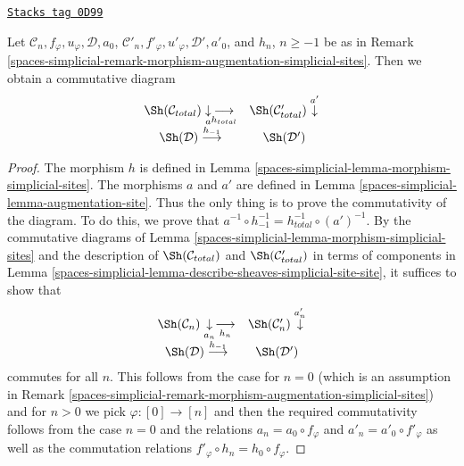 \begin{lemma}
\label{spaces-simplicial-lemma-morphism-augmentation-simplicial-sites}
\href{https://stacks.math.columbia.edu/tag/0D99}{\texttt{Stacks tag 0D99}}

Let $\mathcal{C}_n, f_\varphi, u_\varphi, \mathcal{D}, a_0$,
$\mathcal{C}'_n, f'_\varphi, u'_\varphi, \mathcal{D}', a'_0$, and
$h_n$, $n \geq -1$ be as in
Remark \ref{spaces-simplicial-remark-morphism-augmentation-simplicial-sites}.
Then we obtain a commutative diagram
$$
\begin{array}{cc}\Sh(\mathcal{C}_{total}) \underset{a}{\downarrow}\underset{h_{total}}{\longrightarrow} & \Sh(\mathcal{C}'_{total}) \overset{a'}{\downarrow} \\ \Sh(\mathcal{D}) \overset{h_{-1}}{\longrightarrow} & \Sh(\mathcal{D}')\end{array}
$$
\end{lemma}

\begin{proof}
The morphism $h$ is defined in Lemma \ref{spaces-simplicial-lemma-morphism-simplicial-sites}.
The morphisms $a$ and $a'$ are defined in Lemma \ref{spaces-simplicial-lemma-augmentation-site}.
Thus the only thing is to prove the commutativity of the diagram.
To do this, we prove that
$a^{-1} \circ h_{-1}^{-1} = h_{total}^{-1} \circ (a')^{-1}$.
By the commutative diagrams of
Lemma \ref{spaces-simplicial-lemma-morphism-simplicial-sites}
and the description of $\Sh(\mathcal{C}_{total})$
and $\Sh(\mathcal{C}'_{total})$ in terms of components
in Lemma \ref{spaces-simplicial-lemma-describe-sheaves-simplicial-site-site},
it suffices to show that
$$
\begin{array}{cc}\Sh(\mathcal{C}_n) \underset{a_n}{\downarrow}\underset{h_n}{\longrightarrow} & \Sh(\mathcal{C}'_n) \overset{a'_n}{\downarrow} \\ \Sh(\mathcal{D}) \overset{h_{-1}}{\longrightarrow} & \Sh(\mathcal{D}')\end{array}
$$
commutes for all $n$. This follows from the case for $n = 0$
(which is an assumption in
Remark \ref{spaces-simplicial-remark-morphism-augmentation-simplicial-sites})
and for $n > 0$ we pick $\varphi : [0] \to [n]$
and then the required commutativity follows from the case $n = 0$
and the relations $a_n = a_0 \circ f_\varphi$
and $a'_n = a'_0 \circ f'_\varphi$
as well as the commutation relations
$f'_\varphi \circ h_n = h_0 \circ f_\varphi$.
\end{proof}

